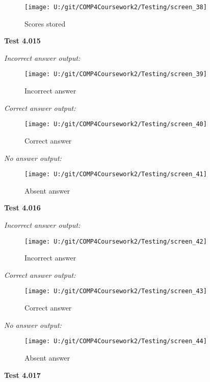 \begin{figure}[H]
    \label{fig: Second Screen}\caption{Scores stored}
    \texttt{[image: U:/git/COMP4Coursework2/Testing/screen\_38]}
\end{figure}

\textbf{Test 4.015}

\textit{Incorrect answer output: }

\begin{figure}[H]
    \label{fig: Second Screen}\caption{Incorrect answer}
    \texttt{[image: U:/git/COMP4Coursework2/Testing/screen\_39]}
\end{figure}

\textit{Correct answer output: }

\begin{figure}[H]
    \label{fig: Second Screen}\caption{Correct answer}
    \texttt{[image: U:/git/COMP4Coursework2/Testing/screen\_40]}
\end{figure}

\textit{No answer output: }

\begin{figure}[H]
    \label{fig: Second Screen}\caption{Absent answer}
    \texttt{[image: U:/git/COMP4Coursework2/Testing/screen\_41]}
\end{figure}

\textbf{Test 4.016}

\textit{Incorrect answer output: }

\begin{figure}[H]
    \label{fig: Second Screen}\caption{Incorrect answer}
    \texttt{[image: U:/git/COMP4Coursework2/Testing/screen\_42]}
\end{figure}

\textit{Correct answer output: }

\begin{figure}[H]
    \label{fig: Second Screen}\caption{Correct answer}
    \texttt{[image: U:/git/COMP4Coursework2/Testing/screen\_43]}
\end{figure}

\textit{No answer output: }

\begin{figure}[H]
    \label{fig: Second Screen}\caption{Absent answer}
    \texttt{[image: U:/git/COMP4Coursework2/Testing/screen\_44]}
\end{figure}

\textbf{Test 4.017}

